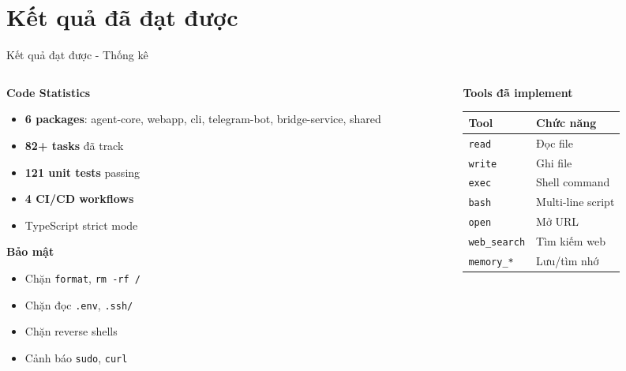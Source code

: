 \documentclass[aspectratio=169,12pt]{beamer}
\begin{document}
\section{Kết quả đã đạt được}

\begin{frame}{Kết quả đạt được - Thống kê}
    \begin{columns}[T]
        \begin{column}{0.48\textwidth}
            \textbf{ Code Statistics}
            \begin{itemize}
                \item \textbf{6 packages}: agent-core, webapp, cli, telegram-bot, bridge-service, shared
                \item \textbf{82+ tasks} đã track
                \item \textbf{121 unit tests} passing
                \item \textbf{4 CI/CD workflows}
                \item TypeScript strict mode
            \end{itemize}

            \vspace{0.5cm}

            \textbf{ Bảo mật}
            \begin{itemize}
                \item Chặn \texttt{format}, \texttt{rm -rf /}
                \item Chặn đọc \texttt{.env}, \texttt{.ssh/}
                \item Chặn reverse shells
                \item Cảnh báo \texttt{sudo}, \texttt{curl}
            \end{itemize}
        \end{column}
        \begin{column}{0.48\textwidth}
            \textbf{ Tools đã implement}
            \begin{tabular}{ll}
                \toprule
                Tool & Chức năng \\
                \midrule
                \texttt{read} & Đọc file \\
                \texttt{write} & Ghi file \\
                \texttt{exec} & Shell command \\
                \texttt{bash} & Multi-line script \\
                \texttt{open} & Mở URL \\
                \texttt{web\_search} & Tìm kiếm web \\
                \texttt{memory\_*} & Lưu/tìm nhớ \\
                \bottomrule
            \end{tabular}


\end{column}
\end{columns}
\end{frame}
\end{document}
